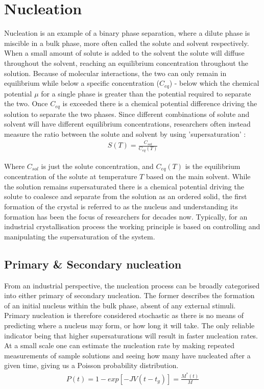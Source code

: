 \section{Nucleation}
Nucleation is an example of a binary phase separation, 
where a dilute phase is miscible in a bulk phase, more 
often called the solute and solvent respectively. When 
a small amount of solute is added to the solvent the 
solute will diffuse throughout the solvent, reaching
an equilibrium concentration throughout the solution. 
Because of molecular interactions, the two can only remain 
in equilibrium while below a specific concentration ($C_{eq}$) 
- below which the chemical potential $\mu$ for a single phase 
is greater than the potential required to separate the two. 
Once $C_{eq}$ is exceeded there is a chemical potential 
difference driving the solution to separate the two phases. 
Since different combinations of solute and solvent will 
have different equilibrium concentrations, researchers often 
instead measure the ratio between the solute and solvent by 
using 'supersaturation' \cite{Mullin2001}:
\begin{align}
	\label{eq:supersaturation}
	S(T) = \frac{C_{sol}}{C_{eq}(T)}
\end{align}

Where $C_{sol}$ is just the solute concentration, and 
$C_{eq}(T)$ is the equilibrium concentration of the solute  
at temperature $T$ based on the main solvent. While the 
solution remains supersaturated there is a chemical 
potential driving the solute to coalesce and separate 
from the solution as an ordered solid, the first 
formation of the crystal is referred to as the 
nucleus and understanding its formation has been the 
focus of researchers for decades now. Typically, for an 
industrial crystallisation process the working principle 
is based on controlling and manipulating the supersaturation 
of the system. 

\subsection{Primary \& Secondary nucleation}
From an industrial perspective, the nucleation process can 
be broadly categorised into either primary of secondary
nucleation. The former describes the formation of an initial
nucleus within the bulk phase, absent of any external stimuli.
Primary nucleation is therefore considered stochastic as there 
is no means of predicting where a nucleus may form, or how long 
it will take. The only reliable indicator being that higher 
supersaturations will result in faster nucleation rates. At a 
small scale one can estimate the nucleation rate by making 
repeated measurements of sample solutions and seeing how many 
have nucleated after a given time, giving us a Poisson probability distribution.
\begin{align}
	P(t) = 1 - exp\left[-JV(t-t_g)\right] = \frac{M^*(t)}{M}
	\label{eq:poisson}
\end{align}

